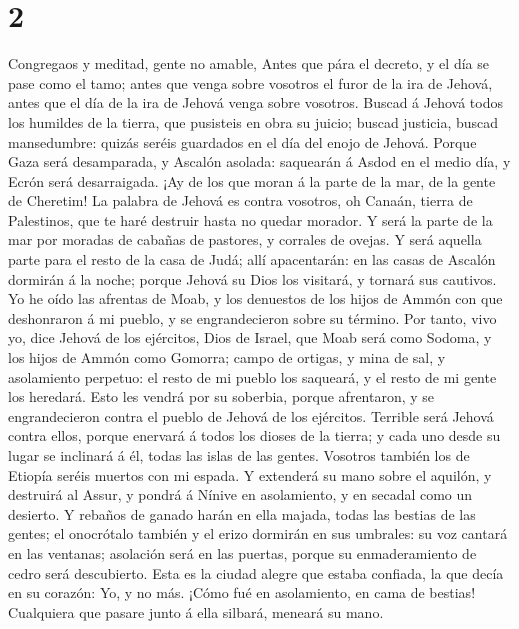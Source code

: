 \hypertarget{section-1}{%
\section{2}\label{section-1}}

 Congregaos y meditad, gente no amable, 
Antes que pára el decreto, y el día se pase como el tamo; antes que
venga sobre vosotros el furor de la ira de Jehová, antes que el día de
la ira de Jehová venga sobre vosotros.  Buscad á Jehová
todos los humildes de la tierra, que pusisteis en obra su juicio; buscad
justicia, buscad mansedumbre: quizás seréis guardados en el día del
enojo de Jehová.  Porque Gaza será desamparada, y Ascalón
asolada: saquearán á Asdod en el medio día, y Ecrón será desarraigada.
 ¡Ay de los que moran á la parte de la mar, de la gente de
Cheretim! La palabra de Jehová es contra vosotros, oh Canaán, tierra de
Palestinos, que te haré destruir hasta no quedar morador. 
Y será la parte de la mar por moradas de cabañas de pastores, y corrales
de ovejas.  Y será aquella parte para el resto de la casa
de Judá; allí apacentarán: en las casas de Ascalón dormirán á la noche;
porque Jehová su Dios los visitará, y tornará sus cautivos.
 Yo he oído las afrentas de Moab, y los denuestos de los
hijos de Ammón con que deshonraron á mi pueblo, y se engrandecieron
sobre su término.  Por tanto, vivo yo, dice Jehová de los
ejércitos, Dios de Israel, que Moab será como Sodoma, y los hijos de
Ammón como Gomorra; campo de ortigas, y mina de sal, y asolamiento
perpetuo: el resto de mi pueblo los saqueará, y el resto de mi gente los
heredará.  Esto les vendrá por su soberbia, porque
afrentaron, y se engrandecieron contra el pueblo de Jehová de los
ejércitos.  Terrible será Jehová contra ellos, porque
enervará á todos los dioses de la tierra; y cada uno desde su lugar se
inclinará á él, todas las islas de las gentes.  Vosotros
también los de Etiopía seréis muertos con mi espada.  Y
extenderá su mano sobre el aquilón, y destruirá al Assur, y pondrá á
Nínive en asolamiento, y en secadal como un desierto.  Y
rebaños de ganado harán en ella majada, todas las bestias de las gentes;
el onocrótalo también y el erizo dormirán en sus umbrales: su voz
cantará en las ventanas; asolación será en las puertas, porque su
enmaderamiento de cedro será descubierto.  Esta es la
ciudad alegre que estaba confiada, la que decía en su corazón: Yo, y no
más. ¡Cómo fué en asolamiento, en cama de bestias! Cualquiera que pasare
junto á ella silbará, meneará su mano.

